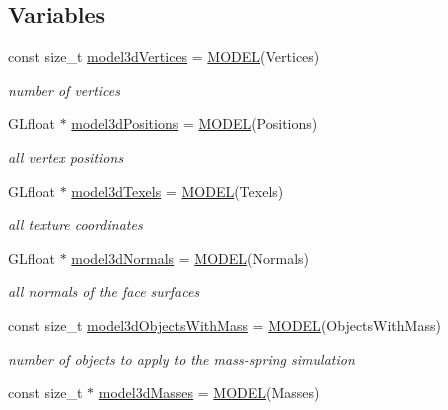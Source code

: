 \subsection*{Variables}
\begin{DoxyCompactItemize}
\item 
const size\+\_\+t \hyperlink{namespacestd_a2c56d5934d3e2877598b1eba9302a70f}{model3d\+Vertices} = \hyperlink{model__mapping_8cpp_a4d1624dd68db4a8494c5e998b5aa60f9}{M\+O\+D\+E\+L}(Vertices)
\begin{DoxyCompactList}\small\item\em number of vertices \end{DoxyCompactList}\item 
G\+Lfloat $\ast$ \hyperlink{namespacestd_aa45ed5de4e82f7ca1e4fd453a157715c}{model3d\+Positions} = \hyperlink{model__mapping_8cpp_a4d1624dd68db4a8494c5e998b5aa60f9}{M\+O\+D\+E\+L}(Positions)
\begin{DoxyCompactList}\small\item\em all vertex positions \end{DoxyCompactList}\item 
G\+Lfloat $\ast$ \hyperlink{namespacestd_a75a224804224819d960875bd982ce0c6}{model3d\+Texels} = \hyperlink{model__mapping_8cpp_a4d1624dd68db4a8494c5e998b5aa60f9}{M\+O\+D\+E\+L}(Texels)
\begin{DoxyCompactList}\small\item\em all texture coordinates \end{DoxyCompactList}\item 
G\+Lfloat $\ast$ \hyperlink{namespacestd_ab62b34140cca60f41eac455edd195e5a}{model3d\+Normals} = \hyperlink{model__mapping_8cpp_a4d1624dd68db4a8494c5e998b5aa60f9}{M\+O\+D\+E\+L}(Normals)
\begin{DoxyCompactList}\small\item\em all normals of the face surfaces \end{DoxyCompactList}\item 
const size\+\_\+t \hyperlink{namespacestd_a74aad4fa6e8a984849221081da2ef691}{model3d\+Objects\+With\+Mass} = \hyperlink{model__mapping_8cpp_a4d1624dd68db4a8494c5e998b5aa60f9}{M\+O\+D\+E\+L}(Objects\+With\+Mass)
\begin{DoxyCompactList}\small\item\em number of objects to apply to the mass-\/spring simulation \end{DoxyCompactList}\item 
const size\+\_\+t $\ast$ \hyperlink{namespacestd_a20a6e87f65453b04a7eac93004989039}{model3d\+Masses} = \hyperlink{model__mapping_8cpp_a4d1624dd68db4a8494c5e998b5aa60f9}{M\+O\+D\+E\+L}(Masses)

\end{DoxyCompactItemize}

